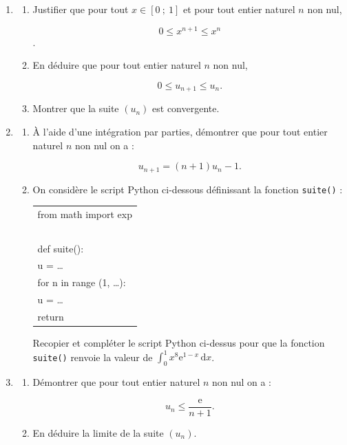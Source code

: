 \documentclass[10pt]{article}
\providecommand{\e}{{\mathrm{e}}}
\begin{document}
\begin{enumerate}
\item 
	\begin{enumerate}
		\item Justifier que pour tout $x \in [0~;~1]$ et pour tout entier naturel $n$ non nul,
		
		\[0 \leqslant x^{n+1} \leqslant x^n\].
		\item En déduire que pour tout entier naturel $n$ non nul,
		
		\[0 \leqslant u_{n+1} \leqslant u_n.\]
			
		\item Montrer que la suite $(u_n)$ est convergente.
	\end{enumerate}
\item 
	\begin{enumerate}
		\item À l’aide d’une intégration par parties, démontrer que pour tout entier naturel $n$ non nul on a :

\[u_{n+1} = (n + 1)u_n - 1.\]

\item On considère le script Python ci-dessous définissant la fonction \texttt{suite()} :

\begin{center}
\begin{ttfamily}
\begin{tabular}{|l|}\hline
from math import exp\\
~\\
def suite():\\
\quad u = \ldots\\
\quad for n in range (1, \ldots):\\
\quad \quad \quad u = \ldots\\
\quad return\\ \hline
\end{tabular}
\end{ttfamily}
\end{center}

Recopier et compléter le script Python ci-dessus pour que la fonction \texttt{suite()} renvoie la valeur de $\displaystyle\int_0^1 x^8 \e^{1-x} \, \text{d}x$.
	\end{enumerate}

\item 
	\begin{enumerate}
		\item Démontrer que pour tout entier naturel $n$ non nul on a :

\[u_{n} \leqslant \frac{\e}{n+1}.\]

		\item En déduire la limite de la suite $(u_n)$.
	\end{enumerate}
\end{enumerate}
\end{document}
